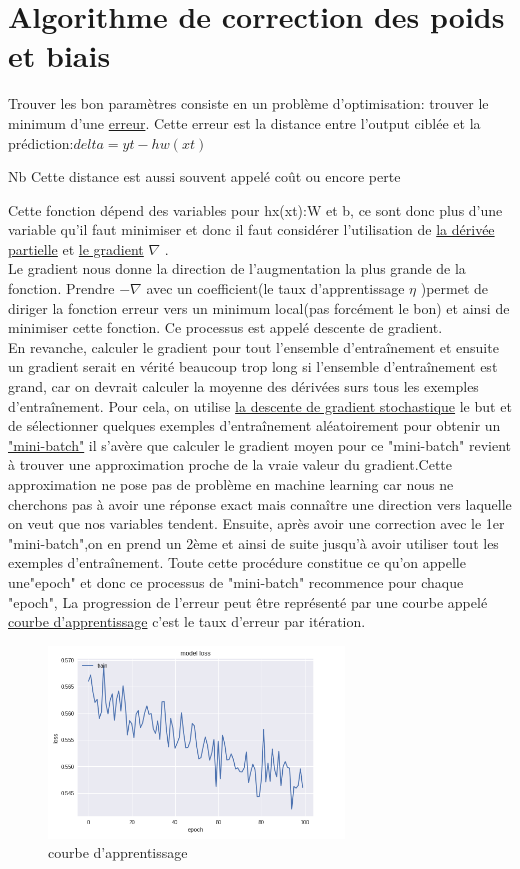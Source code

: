 \documentclass[openany,14pt,fleqn]{book} %
\begin{document}
\section{Algorithme de correction des poids et biais}
Trouver les bon paramètres consiste en un problème d'optimisation: trouver le minimum d'une \underline {erreur}. Cette erreur est la distance entre l'output ciblée et la prédiction:$delta=yt-hw(xt)$\begin{remark}Nb Cette distance est aussi souvent appelé coût ou encore perte\end{remark}
Cette fonction dépend des variables pour hx(xt):W et b, ce sont donc plus d'une variable qu'il faut minimiser et donc il faut considérer l'utilisation de \underline{la dérivée partielle} et \underline {le gradient} $\nabla$ .\\
Le gradient nous donne la direction de l'augmentation la plus grande de la fonction. Prendre $-\nabla$ avec un coefficient(le taux d'apprentissage $\eta$ )permet de diriger la fonction erreur vers un minimum local(pas forcément le bon) et ainsi de minimiser cette fonction. Ce processus est appelé descente de gradient.\\ \linebreak
En revanche, calculer le gradient pour tout l'ensemble d'entraînement et ensuite un gradient serait en vérité beaucoup trop long si l'ensemble d'entraînement est grand, car on devrait calculer la moyenne des dérivées surs tous les exemples d'entraînement. Pour cela, on utilise \underline{la descente de gradient stochastique} le but et de sélectionner quelques exemples d'entraînement aléatoirement pour obtenir un \underline {"mini-batch"} il s'avère que calculer le gradient moyen pour ce "mini-batch" revient à trouver une approximation proche de la vraie valeur du gradient.\newline Cette approximation ne pose pas de problème en machine learning car nous ne cherchons pas à avoir une réponse exact mais connaître une direction vers laquelle on veut que nos variables tendent.
Ensuite, après avoir une correction avec le 1er "mini-batch",on en prend un 2ème et ainsi de suite jusqu'à avoir utiliser tout les exemples d'entraînement. Toute cette procédure constitue ce qu'on appelle une"epoch" et donc ce processus de "mini-batch" recommence pour chaque "epoch",
La progression de l'erreur peut être représenté par une courbe appelé \underline {courbe d'apprentissage} c'est le taux d'erreur par itération.\\
\begin{figure}[h]
\centering
\includegraphics[width=0.7\textwidth]{Pictures/Courbe d'apprentissage.png}
\caption{courbe d'apprentissage}
\end{figure}
\end{document}
